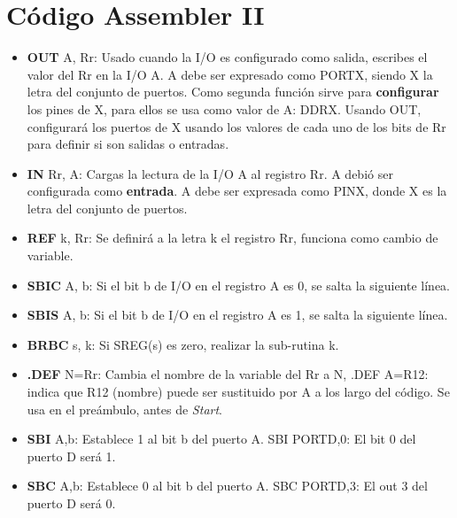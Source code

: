 \documentclass[
	12pt, %
	fleqn, %
	a4paper, %
	oneside, %
]{LegrandOrangeBook}
\begin{document}
\section{Código Assembler II}\label{Código Assembler II}
\begin{itemize}
\item \textbf{OUT} A, Rr: Usado cuando la I/O es configurado como salida, escribes el valor del Rr en la I/O A. A debe ser expresado como PORTX, siendo X la letra del conjunto de puertos. Como segunda función sirve para \textbf{configurar} los pines de X, para ellos se usa como valor de A: DDRX. Usando OUT, configurará los puertos de X usando los valores de cada uno de los bits de Rr para definir si son salidas o entradas.
\item \textbf{IN} Rr, A: Cargas la lectura de la I/O A al registro Rr. A debió ser configurada como \textbf{entrada}. A debe ser expresada como PINX, donde X es la letra del conjunto de puertos.
\item \textbf{REF} k, Rr: Se definirá a la letra k el registro Rr, funciona como cambio de variable.
\item \textbf{SBIC} A, b: Si el bit b de I/O en el registro A es 0, se salta la siguiente línea.
\item \textbf{SBIS} A, b: Si el bit b de I/O en el registro A es 1, se salta la siguiente línea.
\item \textbf{BRBC} s, k: Si SREG(s) es zero, realizar la sub-rutina k.
\item \textbf{.DEF} N=Rr:  Cambia el nombre de la variable del Rr a N, .DEF A=R12: indica que R12 (nombre) puede ser sustituido por A a los largo del código. Se usa en el preámbulo, antes de \textit{Start}.
\item \textbf{SBI} A,b: Establece 1 al bit b del puerto A. SBI PORTD,0: El bit 0 del puerto D será 1.
\item \textbf{SBC} A,b: Establece 0 al bit b del puerto A. SBC PORTD,3: El out 3 del puerto D será 0.
\end{itemize}
\end{document}
